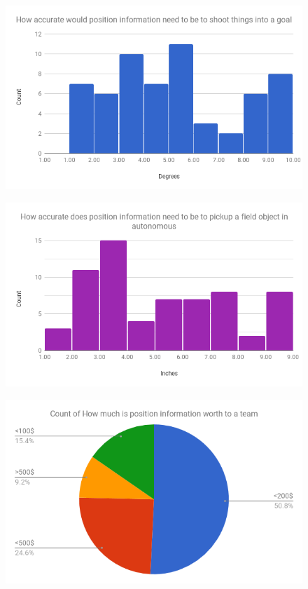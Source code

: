 \documentclass{article}
\begin{document}
  \begin{figure}[H]
    \centering
    \includegraphics[width=1\linewidth]{./survey_angle.png}
    \label{fig:survey_angle}
  \end{figure}

  \begin{figure}[H]
    \centering
    \includegraphics[width=1\linewidth]{./survey_position.png}
    \label{fig:survey_position}
  \end{figure}

  \begin{figure}[H]
    \centering
    \includegraphics[width=1\linewidth]{./survey_worth.png}
    \label{fig:survey_worth}
  \end{figure}
\end{document}
